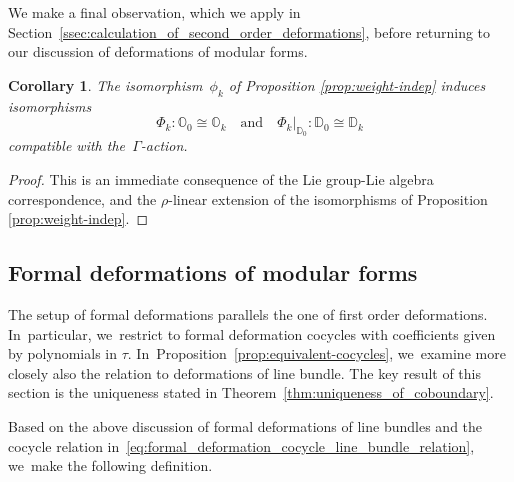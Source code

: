 \documentclass[JEP,XML,SOM,Unicode,published]{cedram}
\theoremstyle{plain}
\newtheorem{corollary}[theoremcounter]{Corollary}
\theoremstyle{definition}
\newcommand{\nbd}{\nobreakdash-\hspace{0pt}}
\newcommand{\bbD}{\ensuremath{\mathbb{D}}}
\newcommand{\bbO}{\ensuremath{\mathbb{O}}}
\newcommand{\defcol}{\mathrel{:}}
\let\Ga\Gamma
\begin{document}
We make a final observation, which we apply in Section~\ref{ssec:calculation_of_second_order_deformations}, before returning to our discussion of deformations of modular forms.

\begin{corollary}\label{cor:weight-indep}
The isomorphism~$\phi_k$ of Proposition \ref{prop:weight-indep} induces isomorphisms
\begin{equation*}
\Phi_k \defcol \bbO_0\cong \bbO_k
\quad\text{and}\quad
\Phi_k \big|_{\bbD_0}: \bbD_0 \cong\bbD_k
\end{equation*}
compatible with the~$\Ga$\nbd{}action.
\end{corollary}

\begin{proof}
This is an immediate consequence of the Lie group-Lie algebra correspondence, and the $\rho$-linear extension of the isomorphisms of Proposition \ref{prop:weight-indep}.
\end{proof}

\subsection{Formal deformations of modular forms}
\label{ssec:formal_deformations_modular_forms}

The setup of formal deformations parallels the one of first order deformations. In~particular, we~restrict to formal deformation cocycles with coefficients given by polynomials in $\tau$. In~Proposition~\ref{prop:equivalent-cocycles}, we~examine more closely also the relation to deformations of line bundle. The key result of this section is the uniqueness stated in Theorem~\ref{thm:uniqueness_of_coboundary}.

Based on the above discussion of formal deformations of line bundles and the cocycle relation in~\eqref{eq:formal_deformation_cocycle_line_bundle_relation}, we~make the following definition.
\end{document}
